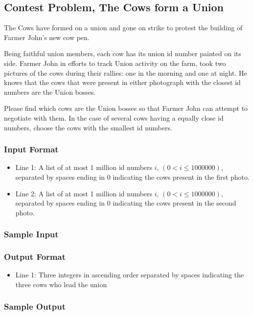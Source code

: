 \subsection{Contest Problem, The Cows form a Union}
The Cows have formed on a union and gone on strike to protest the building of Farmer John's new cow pen.

Being faithful union members, each cow has its union id number painted on its side.
Farmer John in efforts to track Union activity on the farm, took two pictures of the cows during their rallies: one in the morning and one at night.
He knows that the cows that were present in either photograph with the closest id numbers are the Union bosses.

Please find which cows are the Union bosses so that Farmer John can attempt to negotiate with them.
In the case of several cows having a equally close id numbers, choose the cows with the smallest id numbers.

\subsubsection{Input Format}
\begin{itemize}
	\item Line 1: A list of at most 1 million id numbers $i$, $(0 < i \leq 1000000)$, separated by spaces ending in $0$ indicating the cows present in the first photo.
	\item Line 2: A list of at most 1 million id numbers $i$, $(0 < i \leq 1000000)$, separated by spaces ending in $0$ indicating the cows present in the second photo.
\end{itemize}

\subsubsection{Sample Input}


\subsubsection{Output Format}
\begin{itemize}
  \item Line 1: Three integers in ascending order separated by spaces indicating the three cows who lead the union
\end{itemize}

\subsubsection{Sample Output}



